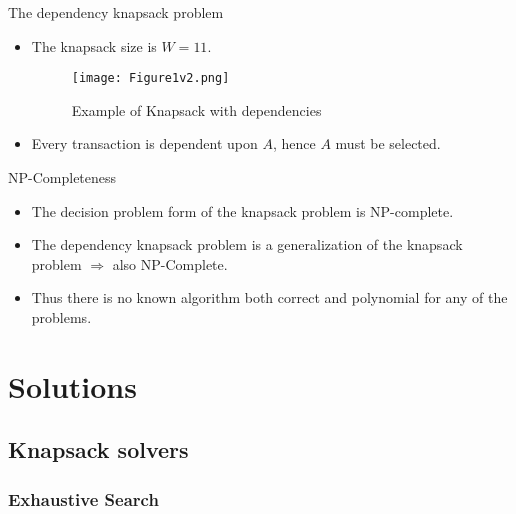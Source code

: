 \documentclass{beamer}
\begin{document}
\begin {frame}{The dependency knapsack problem} %
    \begin{example}
    \begin{itemize}
        \item {The knapsack size is $W=11$.}
        \begin{figure}
            \centering
            \texttt{[image: Figure1v2.png]}
            \caption{Example of Knapsack with dependencies}
        \end{figure}
        \item {Every transaction is dependent upon $A$, hence $A$ must be 
        selected.} 
    \end{itemize}
    \end{example}
\end{frame}
\begin{frame}{NP-Completeness}
    \begin{itemize}
        \item {The decision problem form of the knapsack problem is 
        NP-complete.}
        \item {The dependency knapsack problem is a generalization of the 
        knapsack problem $\Rightarrow$ also NP-Complete.}
        \item {Thus there is no known algorithm both correct and polynomial
        for any of the problems.}
    \end{itemize}
\end{frame}

\section {Solutions}
\subsection* {Knapsack solvers}
\subsubsection* {Exhaustive Search}
\end{document}
